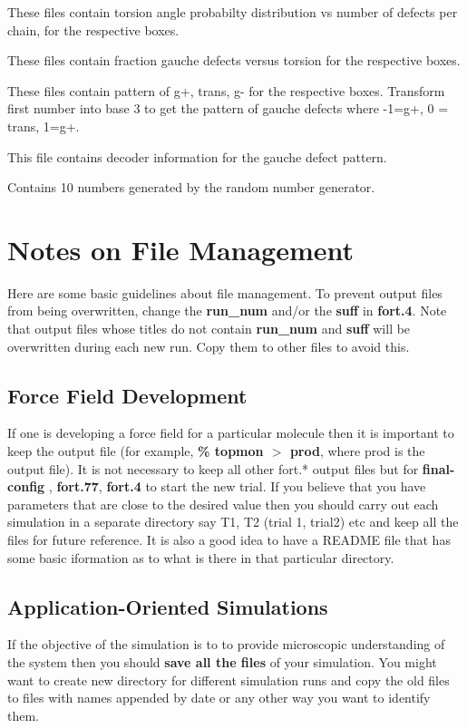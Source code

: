\documentclass[12pt,letterpaper]{article}
\begin{document}
{{{{{{ These
files contain torsion angle probabilty distribution vs number of
defects per chain, for the respective boxes.

 These files contain fraction gauche defects versus
torsion for the respective boxes.

 These
files contain pattern of g+, trans, g- for the respective
boxes. Transform first number into base 3 to get the pattern of gauche
defects where -1=g+, 0 = trans, 1=g+.

 This file contains decoder information for
the gauche defect pattern.

 Contains 10 numbers generated by the 
random number generator. 

\section{Notes on File Management}
\noindent Here are some basic guidelines about file management. 
To prevent output files from being overwritten, change the {\bf run\_num} and/or
the {\bf suff} in {\bf fort.4}.  Note that output files whose titles do not contain {\bf run\_num}
and {\bf suff} will be overwritten during each new run.  Copy them to other files to avoid this.

\subsection{Force Field Development} If one is developing a force
field for a particular molecule then it is important to keep the
output file (for example, {\bf \% topmon $>$ prod}, where prod is the
output file). It is not necessary to keep all other fort.* output
files but for {\bf final-config} , {\bf fort.77}, {\bf fort.4} to
start the new trial. If you believe that you have parameters that are
close to the desired value then you should carry out each simulation
in a separate directory say T1, T2 (trial 1, trial2) etc and keep all
the files for future reference. It is also a good idea to have a
README file that has some basic iformation as to what is there in that
particular directory.
 
\subsection{Application-Oriented Simulations} If the objective of
the simulation is to to provide microscopic understanding of the
system then you should {\bf save all the files} of your simulation. You
might want to create new directory for different simulation runs and
copy the old files to files with names appended by date or any other
way you want to identify them.

}}}}}}
\end{document}
